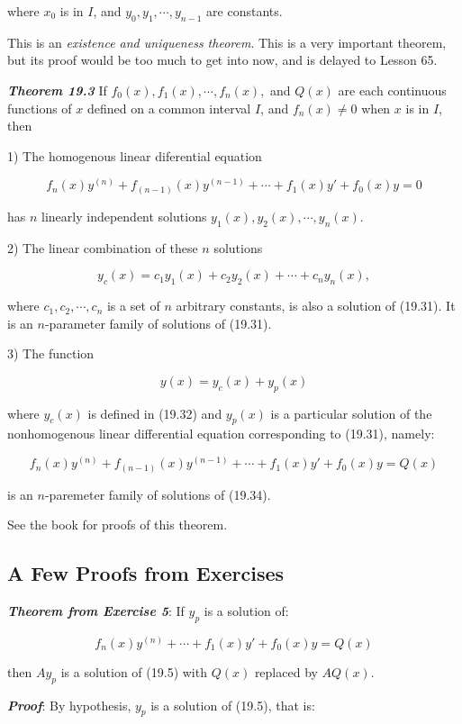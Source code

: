 \documentclass{article}
\begin{document}
where $x_0$ is in $I$, and $y_0, y_1, \cdots, y_{n-1}$ are constants.

This is an \emph{existence and uniqueness theorem}. This is a very important theorem, but its proof would be too much to get into now, and is delayed to Lesson 65.

\emph{\textbf{Theorem 19.3}} If $f_0(x),f_1(x),\cdots,f_n(x),$ and $Q(x)$ are each \@{continuous} functions of $x$ defined on a common interval $I$, and $f_n(x) \neq 0$ when $x$ is in $I$, then

1) The homogenous linear diferential equation

\[ \tag{19.31} f_n(x)y^{(n)} + f_{(n-1)}(x)y^{(n-1)} + \cdots + f_1(x)y' + f_0(x)y = 0 \]

has $n$ linearly independent solutions $y_1(x), y_2(x), \cdots, y_n(x)$.

2) The linear combination of these $n$ solutions

\[ \tag{19.32} y_c(x) = c_1y_1(x) + c_2y_2(x) + \cdots + c_ny_n(x), \]

where $c_1, c_2, \cdots, c_n$ is a set of $n$ arbitrary constants, is also a solution of (19.31). It is an $n$-parameter family of solutions of (19.31).

3) The function

\[ \tag{19.33} y(x) = y_c(x) + y_p(x) \]

where $y_c(x)$ is defined in (19.32) and $y_p(x)$ is a particular solution of the nonhomogenous linear differential equation corresponding to (19.31), namely:

\[ \tag{19.34} f_n(x)y^{(n)} + f_{(n-1)}(x)y^{(n-1)} + \cdots + f_1(x)y' + f_0(x)y = Q(x) \]

is an $n$-paremeter family of solutions of (19.34). 

See the book for proofs of this theorem.

\subsection{A Few Proofs from Exercises}

\emph{\textbf{Theorem from Exercise 5}}: If $y_p$ is a solution of:

\[ \tag{19.5} f_n(x)y^{(n)} + \cdots + f_1(x)y' + f_0(x)y = Q(x) \]

then $Ay_p$ is a solution of (19.5) with $Q(x)$ replaced by $AQ(x).$

\emph{\textbf{Proof}}: By hypothesis, $y_p$ is a solution of (19.5), that is:
\end{document}
